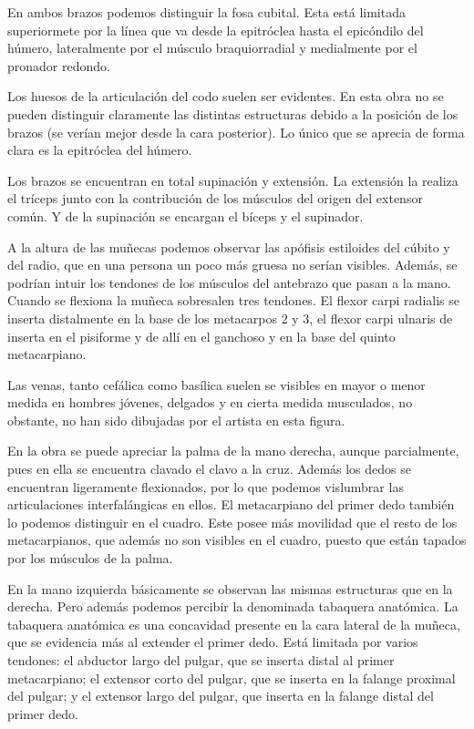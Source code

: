 En ambos brazos podemos distinguir la fosa cubital. Esta está limitada superiormete por la línea que va desde la epitróclea hasta el epicóndilo del húmero, lateralmente por el músculo braquiorradial y medialmente por el pronador redondo.

Los huesos de la articulación del codo suelen ser evidentes. En esta obra no se pueden distinguir claramente las distintas estructuras debido a la posición de los brazos (se verían mejor desde la cara posterior). Lo único que se aprecia de forma clara es la epitróclea del húmero.

Los brazos se encuentran en total supinación y extensión. La extensión la realiza el tríceps junto con la contribución de los músculos del origen del extensor común. Y de la supinación se encargan el bíceps y el supinador.

A la altura de las muñecas podemos observar las apófisis estiloides del cúbito y del radio, que en una persona un poco más gruesa no serían visibles. Además, se podrían intuir los tendones de los músculos del antebrazo que pasan a la mano. Cuando se flexiona la muñeca sobresalen tres tendones. El flexor carpi radialis se inserta distalmente en la base de los metacarpos 2 y 3, el flexor carpi ulnaris de inserta en el pisiforme y de allí en el ganchoso y en la base del quinto metacarpiano.

Las venas, tanto cefálica como basílica suelen se visibles en mayor o menor medida en hombres jóvenes, delgados y en cierta medida musculados, no obstante, no han sido dibujadas por el artista en esta figura.

En la obra se puede apreciar la palma de la mano derecha, aunque parcialmente, pues en ella se encuentra clavado el clavo a la cruz. Además los dedos se encuentran ligeramente flexionados, por lo que podemos vislumbrar las articulaciones interfalángicas en ellos. El metacarpiano del primer dedo también lo podemos distinguir en el cuadro. Este posee más movilidad que el resto de los metacarpianos, que además no son visibles en el cuadro, puesto que están tapados por los músculos de la palma.

En la mano izquierda básicamente se observan las mismas estructuras que en la derecha. Pero además podemos percibir la denominada tabaquera anatómica. La tabaquera anatómica es una concavidad presente en la cara lateral de la muñeca, que se evidencia más al extender el primer dedo. Está limitada por varios tendones: el abductor largo del pulgar, que se inserta distal al primer metacarpiano; el extensor corto del pulgar, que se inserta en la falange proximal del pulgar; y el extensor largo del pulgar, que inserta en la falange distal del primer dedo.

